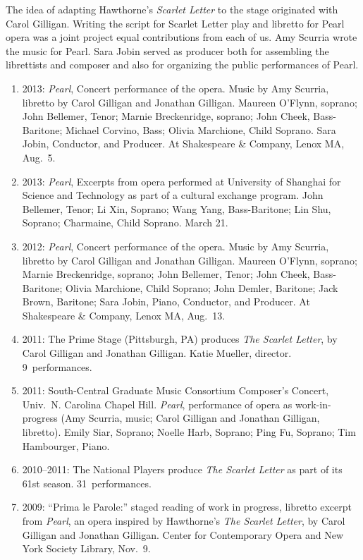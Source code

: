 %
%
The idea of adapting Hawthorne's \emph{Scarlet Letter\/} to the stage originated with Carol Gilligan. Writing the script for Scarlet Letter play and libretto for Pearl opera was a joint project equal contributions from each of us. Amy Scurria wrote the music for Pearl. Sara Jobin served as producer both for assembling the librettists and composer and also for organizing the public performances of Pearl.
\begin{enumerate}
\item  2013: \emph{Pearl}, Concert performance of the opera. Music by Amy Scurria, libretto by Carol Gilligan and Jonathan Gilligan. Maureen O'Flynn, soprano; John Bellemer, Tenor; Marnie Breckenridge, soprano; John Cheek, Bass-Baritone; Michael Corvino, Bass; Olivia Marchione, Child Soprano. Sara Jobin, Conductor, and Producer. At Shakespeare \& Company, Lenox MA, Aug.~5.
\item 2013: \emph{Pearl}, Excerpts from opera performed at University of Shanghai for Science and Technology as part of a cultural exchange program. John Bellemer, Tenor; Li Xin, Soprano; Wang Yang, Bass-Baritone; Lin Shu, Soprano; Charmaine, Child Soprano. March 21.
\item  2012: \emph{Pearl}, Concert performance of the opera. Music by Amy Scurria, libretto by Carol Gilligan and Jonathan Gilligan. Maureen O'Flynn, soprano; Marnie Breckenridge, soprano; John Bellemer, Tenor; John Cheek, Bass-Baritone; Olivia Marchione, Child Soprano; John Demler, Baritone; Jack Brown, Baritone; Sara Jobin, Piano, Conductor, and Producer. At Shakespeare \& Company, Lenox MA, Aug.~13.
\item 2011: The Prime Stage (Pittsburgh, PA) produces \emph{The Scarlet Letter}, by Carol Gilligan and Jonathan Gilligan. Katie Mueller, director. 9~performances.
\item 2011: South-Central Graduate Music Consortium Composer's Concert, Univ.\ N. Carolina Chapel Hill. \emph{Pearl}, performance of opera as work-in-progress (Amy Scurria, music; Carol Gilligan and Jonathan Gilligan, libretto). Emily Siar, Soprano; Noelle Harb, Soprano; Ping Fu, Soprano; Tim Hambourger, Piano. 
\item 2010--2011: The National Players produce \textit{The Scarlet Letter\/} as part of its 61st season. 31~performances.
\item 2009: ``Prima le Parole:'' staged reading of work in progress, libretto excerpt from \emph{Pearl}, an opera inspired by Hawthorne's \emph{The Scarlet Letter}, by Carol Gilligan and Jonathan Gilligan. Center for Contemporary Opera and New York Society Library, Nov.~9. 

\end{enumerate}
